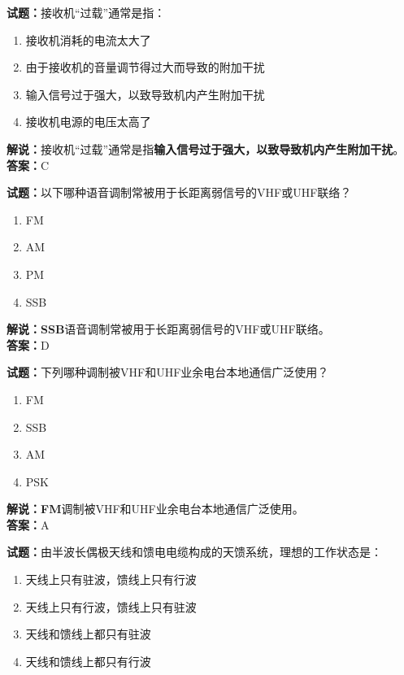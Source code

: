 \documentclass{ctexbook}
\begin{document}
\bigskip


\noindent\textbf{试题：}接收机“过载”通常是指：

\begin{enumerate}[leftmargin=3em]
	\item 接收机消耗的电流太大了
	\item 由于接收机的音量调节得过大而导致的附加干扰
	\item 输入信号过于强大，以致导致机内产生附加干扰
	\item 接收机电源的电压太高了
\end{enumerate}

\noindent\textbf{解说：}接收机“过载”通常是指\textbf{输入信号过于强大，以致导致机内产生附加干扰}。\\\noindent\textbf{答案：}C%


\bigskip


\noindent\textbf{试题：}以下哪种语音调制常被用于长距离弱信号的VHF或UHF联络？

\begin{enumerate}[leftmargin=3em]
	\item FM
	\item AM
	\item PM
	\item SSB
\end{enumerate}

\noindent\textbf{解说：}\textbf{SSB}语音调制常被用于长距离弱信号的VHF或UHF联络。\\\noindent\textbf{答案：}D


\bigskip


\noindent\textbf{试题：}下列哪种调制被VHF和UHF业余电台本地通信广泛使用？

\begin{enumerate}[leftmargin=3em]
	\item FM
	\item SSB
	\item AM
	\item PSK
\end{enumerate}


\noindent\textbf{解说：}\textbf{FM}调制被VHF和UHF业余电台本地通信广泛使用。\\\noindent\textbf{答案：}A


\bigskip





\noindent\textbf{试题：}由半波长偶极天线和馈电电缆构成的天馈系统，理想的工作状态是：

\begin{enumerate}[leftmargin=3em]
	\item 天线上只有驻波，馈线上只有行波
	\item 天线上只有行波，馈线上只有驻波
	\item 天线和馈线上都只有驻波
	\item 天线和馈线上都只有行波
\end{enumerate}
\end{document}
